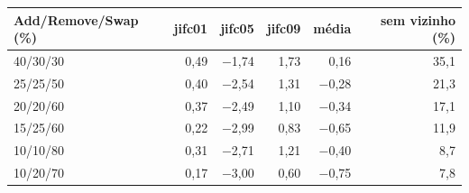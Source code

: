 \begin{tabular}{lrrrrr}
\toprule
Add/Remove/Swap (\%) & jifc01 & jifc05 & jifc09 & média & sem vizinho (\%) \\ \midrule
40/30/30 & 0{,}49 & $-$1{,}74 & 1{,}73 & 0{,}16 & 35{,}1 \\
25/25/50 & 0{,}40 & $-$2{,}54 & 1{,}31 & $-$0{,}28 & 21{,}3 \\
20/20/60 & 0{,}37 & $-$2{,}49 & 1{,}10 & $-$0{,}34 & 17{,}1 \\
15/25/60 & 0{,}22 & $-$2{,}99 & 0{,}83 & $-$0{,}65 & 11{,}9 \\
10/10/80 & 0{,}31 & $-$2{,}71 & 1{,}21 & $-$0{,}40 & 8{,}7 \\
10/20/70 & 0{,}17 & $-$3{,}00 & 0{,}60 & $-$0{,}75 & 7{,}8 \\
\bottomrule
\end{tabular}

